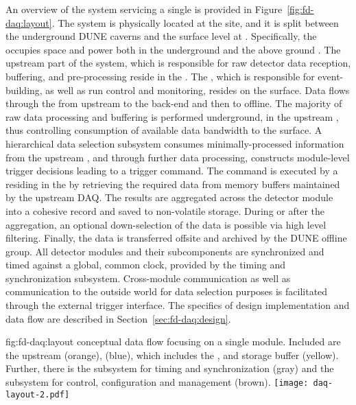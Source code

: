 An overview of the    system 
servicing a single 
 is
provided in Figure~\ref{fig:fd-daq:layout}. The system is
physically located at the  site, and it is split between the
underground DUNE caverns and the surface level at . Specifically, the  occupies space and
power both in the underground  and the above ground .
The upstream part of the system, which is responsible for
raw detector data reception, buffering, and pre-processing reside in the .
The ,
which is responsible for
event-building, as well as run control and monitoring, resides on the
surface.
Data flows through the  from 
upstream to the back-end and then to offline. The majority
of raw data processing and buffering is performed underground, in the
upstream , thus controlling consumption of available data bandwidth  to the surface. A
hierarchical data selection subsystem consumes minimally-processed
information from the upstream , and through further data processing, 
constructs module-level trigger decisions leading to a trigger command.
The command is executed by a  residing in the 
by retrieving the required data from memory buffers maintained by the upstream DAQ.
The results are aggregated across the detector module into a cohesive record and saved to non-volatile storage.
During or after the aggregation, an optional down-selection of the data is possible via
high level filtering.
Finally, the data is  transferred offsite and archived by the DUNE offline group.
All
detector modules and their subcomponents are synchronized and timed against a global,
common clock, provided by the timing and synchronization
subsystem. Cross-module communication as well as communication
to the outside world for data selection purposes is facilitated
through the external trigger interface. The
specifics of design implementation and data flow are described in Section~\ref{sec:fd-daq:design}.

\begin{dunefigure}{fig:fd-daq:layout}{ conceptual data flow focusing on a single \nominalmodsize module. Included are the upstream  (orange),  (blue),  which includes the ,  and storage buffer (yellow).
    Further, there is the subsystem for timing and synchronization (gray) and the subsystem for control, configuration and management (brown).
  }
  \texttt{[image: daq-layout-2.pdf]}
\end{dunefigure}


